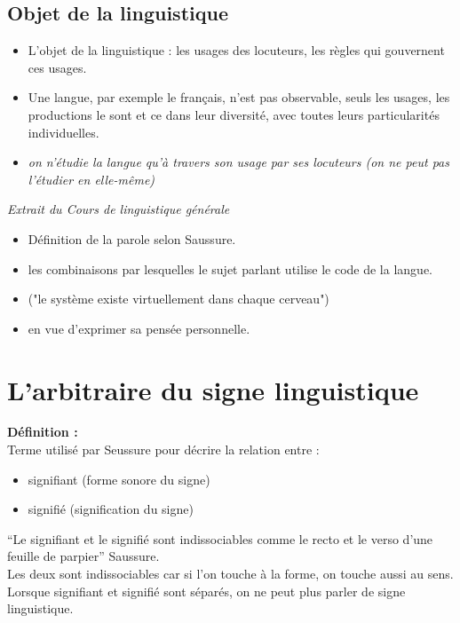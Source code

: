\subsection{Objet de la linguistique}
\begin{itemize}
   \item L'objet de la linguistique : les usages des locuteurs,  les règles qui gouvernent ces usages.
   \item Une langue, par exemple le français, n'est pas observable, seuls les usages, les productions le sont et ce dans leur diversité, avec toutes leurs particularités individuelles.
   \item \textit{on n'étudie la langue qu'à travers son usage par ses locuteurs (on ne peut pas l'étudier en elle-même)}
\end{itemize}

\emph{Extrait du \textit{Cours de linguistique générale}}
\begin{itemize}
   \item Définition de la parole selon Saussure.
   \item les combinaisons par lesquelles le sujet parlant utilise le code de la langue.
   \item ("le système existe virtuellement dans chaque cerveau")
   \item en vue d'exprimer sa pensée personnelle.
\end{itemize}

\section{L'arbitraire du signe linguistique}

\textbf{Définition :}\\
   Terme utilisé par Seussure pour décrire la relation entre :
  \begin{itemize} 
      \item signifiant (forme sonore du signe)
      \item signifié (signification du signe)
  \end{itemize}
\enquote{Le signifiant et le signifié sont indissociables comme le recto et le verso d'une feuille de parpier} Saussure.\\
Les deux sont indissociables car si l'on touche à la forme, on touche aussi au sens.\\
Lorsque signifiant et signifié sont séparés, on ne peut plus parler de signe linguistique.

